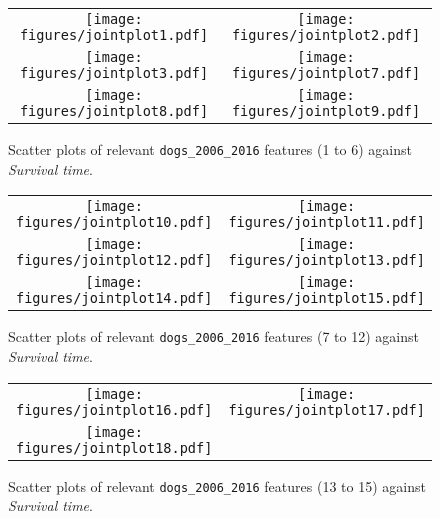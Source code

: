 \documentclass[12pt]{report}
\begin{document}
\begin{subfigures}
\begin{figure}[hp]
  	\caption{Scatter plots of relevant \texttt{dogs\_2006\_2016} features (1 to 6) against \textit{Survival time}.}
  	\label{jointplotsfig:a}
	\begin{adjustwidth}{-1.5in}{-1in}
  	\centering
  	\begin{tabular}{cc}
  		\texttt{[image: figures/jointplot1.pdf]} & 
  		\texttt{[image: figures/jointplot2.pdf]} \\
		\texttt{[image: figures/jointplot3.pdf]} &
		\texttt{[image: figures/jointplot7.pdf]} \\
		\texttt{[image: figures/jointplot8.pdf]} & 
  		\texttt{[image: figures/jointplot9.pdf]} \\
  	\end{tabular}
  	\end{adjustwidth}
\end{figure}
\begin{figure}[hp]
	\caption{Scatter plots of relevant \texttt{dogs\_2006\_2016} features (7 to 12) against \textit{Survival time}.}
  	\label{jointplotsfig:b}
	\begin{adjustwidth}{-1.5in}{-1in}
  	\centering
  	\begin{tabular}{cc}
		\texttt{[image: figures/jointplot10.pdf]} &
		\texttt{[image: figures/jointplot11.pdf]} \\
		\texttt{[image: figures/jointplot12.pdf]} &
		\texttt{[image: figures/jointplot13.pdf]} \\
		\texttt{[image: figures/jointplot14.pdf]} & 
  		\texttt{[image: figures/jointplot15.pdf]} \\
  	\end{tabular}
  	\end{adjustwidth}
\end{figure}
\begin{figure}[hp]
	\caption{Scatter plots of relevant \texttt{dogs\_2006\_2016} features (13 to 15) against \textit{Survival time}.}
  	\label{jointplotsfig:c}
	\begin{adjustwidth}{-1.5in}{-1in}
  	\centering
  	\begin{tabular}{cc}
		\texttt{[image: figures/jointplot16.pdf]} &
		\texttt{[image: figures/jointplot17.pdf]} \\
		\texttt{[image: figures/jointplot18.pdf]}
  	\end{tabular}
  	\end{adjustwidth}
\end{figure}
\end{subfigures}
\end{document}
